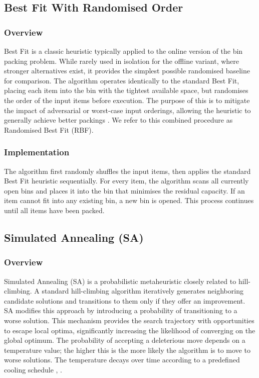 \documentclass[11pt]{article}
\begin{document}
\subsection{Best Fit With Randomised Order}

\subsubsection{Overview}
Best Fit is a classic heuristic typically applied to the online version of the bin packing problem. While rarely used in isolation for the offline variant, where stronger alternatives exist, it provides the simplest possible randomised baseline for comparison. The algorithm operates identically to the standard Best Fit, placing each item into the bin with the tightest available space, but randomises the order of the input items before execution. The purpose of this is to mitigate the impact of adversarial or worst-case input orderings, allowing the heuristic to generally achieve better packings \cite{rajeev}. We refer to this combined procedure as Randomised Best Fit (RBF).

\subsubsection{Implementation}
The algorithm first randomly shuffles the input items, then applies the standard Best Fit heuristic sequentially. For every item, the algorithm scans all currently open bins and places it into the bin that minimises the residual capacity. If an item cannot fit into any existing bin, a new bin is opened. This process continues until all items have been packed.

\subsection{Simulated Annealing (SA)}

\subsubsection{Overview}
Simulated Annealing (SA) is a probabilistic metaheuristic closely related to hill-climbing. A standard hill-climbing algorithm iteratively generates neighboring candidate solutions and transitions to them only if they offer an improvement. SA modifies this approach by introducing a probability of transitioning to a worse solution. This mechanism provides the search trajectory with opportunities to escape local optima, significantly increasing the likelihood of converging on the global optimum. The probability of accepting a deleterious move depends on a temperature value; the higher this is the more likely the algorithm is to move to worse solutions. The temperature decays over time according to a predefined cooling schedule \cite{sean}, \cite{gendreau}.
\end{document}
